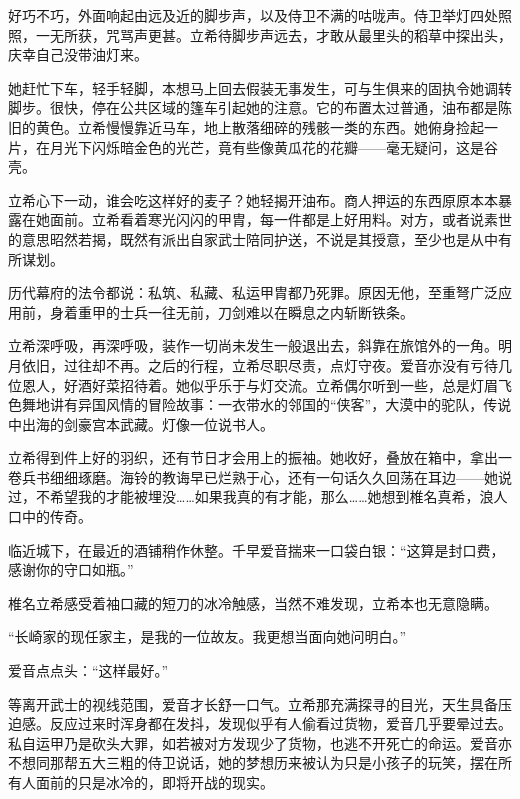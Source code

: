 \documentclass{article}
\begin{document}
好巧不巧，外面响起由远及近的脚步声，以及侍卫不满的咕咙声。侍卫举灯四处照照，一无所获，咒骂声更甚。立希待脚步声远去，才敢从最里头的稻草中探出头，庆幸自己没带油灯来。



她赶忙下车，轻手轻脚，本想马上回去假装无事发生，可与生俱来的固执令她调转脚步。很快，停在公共区域的篷车引起她的注意。它的布置太过普通，油布都是陈旧的黄色。立希慢慢靠近马车，地上散落细碎的残骸一类的东西。她俯身捡起一片，在月光下闪烁暗金色的光芒，竟有些像黄瓜花的花瓣——毫无疑问，这是谷壳。



立希心下一动，谁会吃这样好的麦子？她轻揭开油布。商人押运的东西原原本本暴露在她面前。立希看着寒光闪闪的甲胄，每一件都是上好用料。对方，或者说素世的意思昭然若揭，既然有派出自家武士陪同护送，不说是其授意，至少也是从中有所谋划。



历代幕府的法令都说：私筑、私藏、私运甲胄都乃死罪。原因无他，至重弩广泛应用前，身着重甲的士兵一往无前，刀剑难以在瞬息之内斩断铁条。



立希深呼吸，再深呼吸，装作一切尚未发生一般退出去，斜靠在旅馆外的一角。明月依旧，过往却不再。之后的行程，立希尽职尽责，点灯守夜。爱音亦没有亏待几位恩人，好酒好菜招待着。她似乎乐于与灯交流。立希偶尔听到一些，总是灯眉飞色舞地讲有异国风情的冒险故事：一衣带水的邻国的“侠客”，大漠中的驼队，传说中出海的剑豪宫本武藏。灯像一位说书人。



立希得到件上好的羽织，还有节日才会用上的振袖。她收好，叠放在箱中，拿出一卷兵书细细琢磨。海铃的教诲早已烂熟于心，还有一句话久久回荡在耳边——她说过，不希望我的才能被埋没……如果我真的有才能，那么……她想到椎名真希，浪人口中的传奇。



临近城下，在最近的酒铺稍作休整。千早爱音揣来一口袋白银：“这算是封口费，感谢你的守口如瓶。”



椎名立希感受着袖口藏的短刀的冰冷触感，当然不难发现，立希本也无意隐瞒。



“长崎家的现任家主，是我的一位故友。我更想当面向她问明白。”



爱音点点头：“这样最好。”



等离开武士的视线范围，爱音才长舒一口气。立希那充满探寻的目光，天生具备压迫感。反应过来时浑身都在发抖，发现似乎有人偷看过货物，爱音几乎要晕过去。私自运甲乃是砍头大罪，如若被对方发现少了货物，也逃不开死亡的命运。爱音亦不想同那帮五大三粗的侍卫说话，她的梦想历来被认为只是小孩子的玩笑，摆在所有人面前的只是冰冷的，即将开战的现实。
\end{document}
